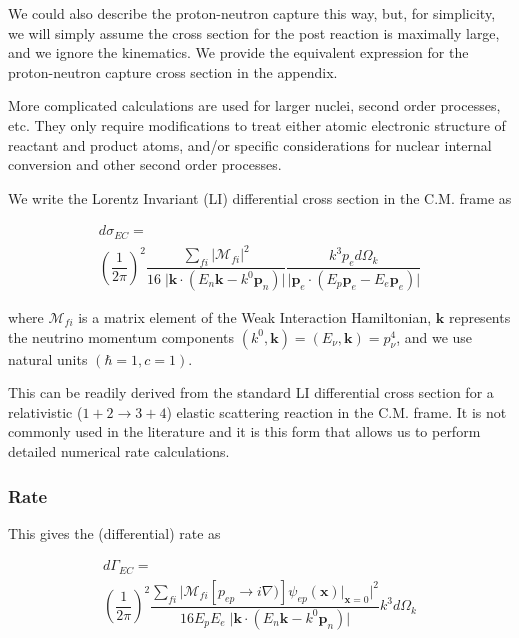 \documentclass[%
 aip,
 jmp,%
 amsmath,amssymb,
 reprint,%
]{revtex4-1}
\begin{document}
We could also describe the proton-neutron capture this way, but, for simplicity, we will simply assume the cross section for the post reaction is maximally large, and we ignore the kinematics.  We provide the equivalent expression for the proton-neutron capture cross section in the appendix.

More complicated calculations are used for larger nuclei, second order processes, etc.  They only require modifications to treat either atomic electronic structure of reactant and product atoms, and/or specific considerations for nuclear internal conversion and other second order processes.

We write the Lorentz Invariant (LI) differential cross section in the C.M. frame as

\begin{multline}
d\sigma_{EC}=
\\\left(\dfrac{1}{2\pi}\right)^{2}\dfrac{\sum_{fi}\big\vert\mathcal{M}_{fi}\big\vert^{2}}{16\;\big\vert\mathbf{k}\cdot(E{_n}\mathbf{k}-k^{0}\mathbf{p}_{n})\big\vert}\dfrac{k^{3}p_{e}d\Omega_{k}}{\big\vert\mathbf{p}_{e}\cdot(E_{p}\mathbf{p}_{e}-E_{e}\mathbf{p}_{e})\big\vert}
\end{multline}


where $\mathcal{M}_{fi}$ is a matrix element of the Weak Interaction Hamiltonian,  $\mathbf{k}$ represents the neutrino momentum components $(k^{0},\mathbf{k})=(E_{\nu},\mathbf{k})=p^{4}_{\nu}$,  and we use natural units $(\hbar=1,c=1)$.

This can be readily derived from the standard LI differential cross section for a relativistic ($1+2\rightarrow 3+4$) elastic scattering reaction in the C.M. frame.  It is not commonly used in the literature and it is this form that  allows us to perform detailed numerical rate calculations.

\subsubsection{Rate}

This gives the (differential) rate as

\begin{multline}
d\Gamma_{EC}=\\
\left(\dfrac{1}{2\pi}\right)^{2}\dfrac{\sum_{fi}\big\vert\mathcal{M}_{fi}\left[p_{ep}\rightarrow i\nabla)\right]\psi_{ep}(\mathbf{x})\big\vert_{\mathbf{x}=0}\big\vert^{2}}{16E_{p}E_{e}\;\big\vert\mathbf{k}\cdot(E{_n}\mathbf{k}-k^{0}\mathbf{p}_{n})\big\vert}k^{3}d\Omega_{k}
\end{multline}
\end{document}
